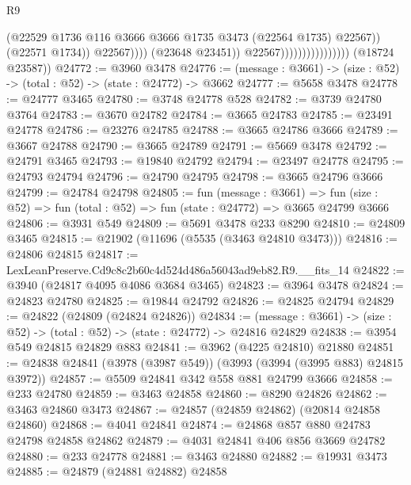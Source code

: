 \begin{lexlean}{R9}
\begin{coremodule}
                                                    (@22529
                                                      @1736
                                                      @116
                                                      @3666
                                                      @3666
                                                      @1735
                                                      @3473
                                                      (@22564 @1735)
                                                      @22567))
                                                  (@22571 @1734))
                                                @22567))))
                                        (@23648 @23451))
                                      @22567))))))))))))))))
      (@18724 @23587))
@24772 := @3960 @3478
@24776 := (message : @3661) -> (size : @52) -> (total : @52) -> (state : @24772) -> @3662
@24777 := @5658 @3478
@24778 := @24777 @3465
@24780 := @3748 @24778 @528
@24782 := @3739 @24780 @3764
@24783 := @3670 @24782
@24784 := @3665 @24783
@24785 := @23491 @24778
@24786 := @23276 @24785
@24788 := @3665 @24786 @3666
@24789 := @3667 @24788
@24790 := @3665 @24789
@24791 := @5669 @3478
@24792 := @24791 @3465
@24793 := @19840 @24792
@24794 := @23497 @24778
@24795 := @24793 @24794
@24796 := @24790 @24795
@24798 := @3665 @24796 @3666
@24799 := @24784 @24798
@24805 := fun (message : @3661) =>
  fun (size : @52) => fun (total : @52) => fun (state : @24772) => @3665 @24799 @3666
@24806 := @3931 @549
@24809 := @5691 @3478 @233 @8290
@24810 := @24809 @3465
@24815 := @21902 (@11696 (@5535 (@3463 @24810 @3473)))
@24816 := @24806 @24815
@24817 := LexLeanPreserve.Cd9c8c2b60c4d524d486a56043ad9eb82.R9.__fits_14
@24822 := @3940 (@24817 @4095 @4086 @3684 @3465)
@24823 := @3964 @3478
@24824 := @24823 @24780
@24825 := @19844 @24792
@24826 := @24825 @24794
@24829 := @24822 (@24809 (@24824 @24826))
@24834 := (message : @3661) -> (size : @52) -> (total : @52) -> (state : @24772) -> @24816 @24829
@24838 := @3954 @549 @24815 @24829 @883
@24841 := @3962 (@4225 @24810) @21880
@24851 := @24838 @24841 (@3978 (@3987 @549)) (@3993 (@3994 (@3995 @883) @24815 @3972))
@24857 := @5509 @24841 @342 @558 @881 @24799 @3666
@24858 := @233 @24780
@24859 := @3463 @24858
@24860 := @8290 @24826
@24862 := @3463 @24860 @3473
@24867 := @24857 (@24859 @24862) (@20814 @24858 @24860)
@24868 := @4041 @24841
@24874 := @24868 @857 @880 @24783 @24798 @24858 @24862
@24879 := @4031 @24841 @406 @856 @3669 @24782
@24880 := @233 @24778
@24881 := @3463 @24880
@24882 := @19931 @3473
@24885 := @24879 (@24881 @24882) @24858

\end{coremodule}
\end{lexlean}
